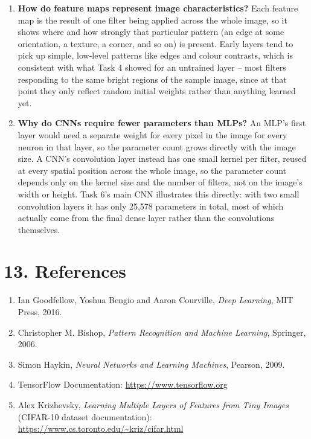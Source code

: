 \documentclass[11pt]{article}
\begin{document}
\begin{enumerate}
\item \textbf{How do feature maps represent image characteristics?}
Each feature map is the result of one filter being applied across the
whole image, so it shows where and how strongly that particular pattern
(an edge at some orientation, a texture, a corner, and so on) is present.
Early layers tend to pick up simple, low-level patterns like edges and
colour contrasts, which is consistent with what Task 4 showed for an
untrained layer -- most filters responding to the same bright regions of
the sample image, since at that point they only reflect random initial
weights rather than anything learned yet.

\item \textbf{Why do CNNs require fewer parameters than MLPs?}
An MLP's first layer would need a separate weight for every pixel in the
image for every neuron in that layer, so the parameter count grows
directly with the image size. A CNN's convolution layer instead has one
small kernel per filter, reused at every spatial position across the
whole image, so the parameter count depends only on the kernel size and
the number of filters, not on the image's width or height. Task 6's main
CNN illustrates this directly: with two small convolution layers it has
only 25,578 parameters in total, most of which actually come from the
final dense layer rather than the convolutions themselves.

\end{enumerate}


\section*{13. References}

\begin{enumerate}

\item Ian Goodfellow, Yoshua Bengio and Aaron Courville,
\emph{Deep Learning}, MIT Press, 2016.

\item Christopher M. Bishop,
\emph{Pattern Recognition and Machine Learning}, Springer, 2006.

\item Simon Haykin,
\emph{Neural Networks and Learning Machines}, Pearson, 2009.

\item TensorFlow Documentation:
\url{https://www.tensorflow.org}

\item Alex Krizhevsky, \emph{Learning Multiple Layers of Features from
Tiny Images} (CIFAR-10 dataset documentation):
\url{https://www.cs.toronto.edu/~kriz/cifar.html}

\end{enumerate}

\end{document}
